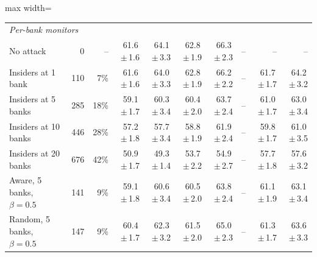 \begin{table}[!htbp]
\begin{adjustbox}{max width=\linewidth}
\begin{tabular}{lrrrrrrrrr}
\multicolumn{10}{l}{\emph{Per-bank monitors}} \\
No attack & 0 & -- & 61.6\,$\pm$\,1.6 & 64.1\,$\pm$\,3.3 & 62.8\,$\pm$\,1.9 & 66.3\,$\pm$\,2.3 & -- & -- & -- \\
Insiders at 1 bank & 110 & 7\% & 61.6\,$\pm$\,1.6 & 64.0\,$\pm$\,3.3 & 62.8\,$\pm$\,1.9 & 66.2\,$\pm$\,2.2 & -- & 61.7\,$\pm$\,1.7 & 64.2\,$\pm$\,3.2 \\
Insiders at 5 banks & 285 & 18\% & 59.1\,$\pm$\,1.7 & 60.3\,$\pm$\,3.4 & 60.4\,$\pm$\,2.0 & 63.7\,$\pm$\,2.4 & -- & 61.0\,$\pm$\,1.7 & 63.0\,$\pm$\,3.4 \\
Insiders at 10 banks & 446 & 28\% & 57.2\,$\pm$\,1.8 & 57.7\,$\pm$\,3.4 & 58.8\,$\pm$\,1.9 & 61.9\,$\pm$\,2.4 & -- & 59.8\,$\pm$\,1.7 & 61.0\,$\pm$\,3.5 \\
Insiders at 20 banks & 676 & 42\% & 50.9\,$\pm$\,1.7 & 49.3\,$\pm$\,1.4 & 53.7\,$\pm$\,2.2 & 54.9\,$\pm$\,2.7 & -- & 57.7\,$\pm$\,1.8 & 57.6\,$\pm$\,3.2 \\
Aware, 5 banks, $\beta=0.5$ & 141 & 9\% & 59.1\,$\pm$\,1.8 & 60.6\,$\pm$\,3.4 & 60.5\,$\pm$\,2.0 & 63.8\,$\pm$\,2.4 & -- & 61.1\,$\pm$\,1.9 & 63.1\,$\pm$\,3.4 \\
Random, 5 banks, $\beta=0.5$ & 147 & 9\% & 60.4\,$\pm$\,1.7 & 62.3\,$\pm$\,3.2 & 61.5\,$\pm$\,2.0 & 65.0\,$\pm$\,2.3 & -- & 61.3\,$\pm$\,1.7 & 63.6\,$\pm$\,3.3 \\
\bottomrule\end{tabular}\end{adjustbox}\end{table}